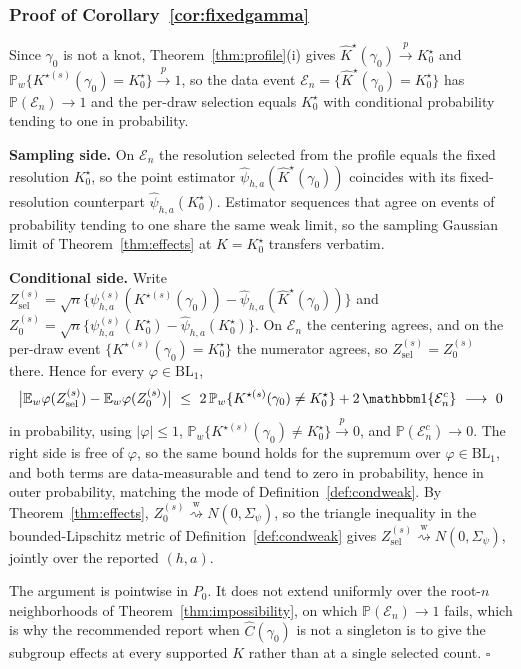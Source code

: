 \documentclass[11pt]{article}
\newcommand{\E}{\mathbb E}
\newcommand{\Pp}{\mathbb P}
\newcommand{\ind}[1]{\mathbbm 1\{#1\}}
\newcommand{\dtow}{\overset{\mathrm w}{\rightsquigarrow}}
\newcommand{\pto}{\overset{p}{\to}}
\newcommand{\BL}{\mathrm{BL}_1}
\begin{document}
\subsubsection{Proof of Corollary~\ref{cor:fixedgamma}}
Since $\gamma_0$ is not a knot, Theorem~\ref{thm:profile}\textup{(i)} gives $\widehat K^\star(\gamma_0)\pto K^\star_0$ and $\Pp_w\{K^{\star(s)}(\gamma_0)=K^\star_0\}\pto1$, so the data event $\mathcal E_n=\{\widehat K^\star(\gamma_0)=K^\star_0\}$ has $\Pp(\mathcal E_n)\to1$ and the per-draw selection equals $K^\star_0$ with conditional probability tending to one in probability.

\textbf{Sampling side.} On $\mathcal E_n$ the resolution selected from the profile equals the fixed resolution $K^\star_0$, so the point estimator $\hat\psi_{h,a}(\widehat K^\star(\gamma_0))$ coincides with its fixed-resolution counterpart $\hat\psi_{h,a}(K^\star_0)$. Estimator sequences that agree on events of probability tending to one share the same weak limit, so the sampling Gaussian limit of Theorem~\ref{thm:effects} at $K=K^\star_0$ transfers verbatim.

\textbf{Conditional side.} Write $Z^{(s)}_{\mathrm{sel}}=\sqrt n\{\psi^{(s)}_{h,a}(K^{\star(s)}(\gamma_0))-\hat\psi_{h,a}(\widehat K^\star(\gamma_0))\}$ and $Z^{(s)}_0=\sqrt n\{\psi^{(s)}_{h,a}(K^\star_0)-\hat\psi_{h,a}(K^\star_0)\}$. On $\mathcal E_n$ the centering agrees, and on the per-draw event $\{K^{\star(s)}(\gamma_0)=K^\star_0\}$ the numerator agrees, so $Z^{(s)}_{\mathrm{sel}}=Z^{(s)}_0$ there. Hence for every $\varphi\in\BL$,
\begin{equation*}
\bigl|\E_w\varphi(Z^{(s)}_{\mathrm{sel}})-\E_w\varphi(Z^{(s)}_0)\bigr|
\ \le\ 2\,\Pp_w\{K^{\star(s)}(\gamma_0)\ne K^\star_0\}+2\,\ind{\mathcal E_n^c}
\ \longrightarrow\ 0
\end{equation*}
in probability, using $|\varphi|\le1$, $\Pp_w\{K^{\star(s)}(\gamma_0)\ne K^\star_0\}\pto0$, and $\Pp(\mathcal E_n^c)\to0$. The right side is free of $\varphi$, so the same bound holds for the supremum over $\varphi\in\BL$, and both terms are data-measurable and tend to zero in probability, hence in outer probability, matching the mode of Definition~\ref{def:condweak}. By Theorem~\ref{thm:effects}, $Z^{(s)}_0\dtow N(0,\Sigma_\psi)$, so the triangle inequality in the bounded-Lipschitz metric of Definition~\ref{def:condweak} gives $Z^{(s)}_{\mathrm{sel}}\dtow N(0,\Sigma_\psi)$, jointly over the reported $(h,a)$.

The argument is pointwise in $P_0$. It does not extend uniformly over the root-$n$ neighborhoods of Theorem~\ref{thm:impossibility}, on which $\Pp(\mathcal E_n)\to1$ fails, which is why the recommended report when $\widehat C(\gamma_0)$ is not a singleton is to give the subgroup effects at every supported $K$ rather than at a single selected count. \hfill$\square$
\end{document}
